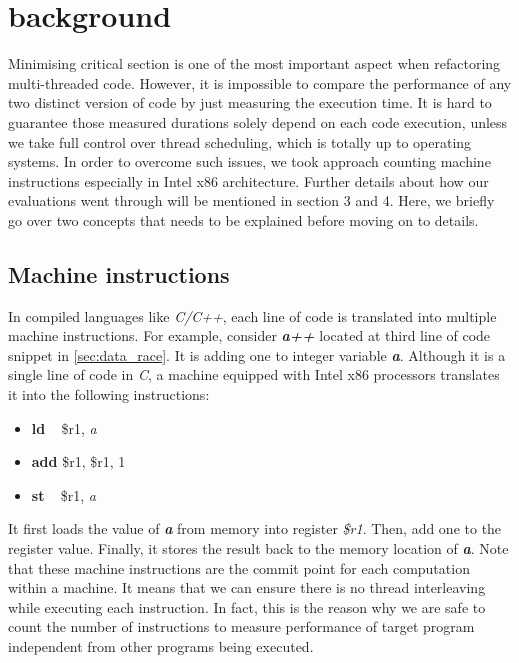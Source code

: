 \section{background}
\label{sec:background}

Minimising critical section is one of the most important aspect when refactoring multi-threaded code. However, it is impossible to compare the performance of any two distinct version of code by just measuring the execution time. It is hard to guarantee those measured durations solely depend on each code execution, unless we take full control over thread scheduling, which is totally up to operating systems. In order to overcome such issues, we took approach counting machine instructions especially in Intel x86 architecture. Further details about how our evaluations went through will be mentioned in section 3 and 4. Here, we briefly go over two concepts that needs to be explained before moving on to details.



\subsection{Machine instructions}
In compiled languages like \textit{C/C++}, each line of code is translated into multiple machine instructions. For example, consider \textbf{\textit{a++}} located at third line of code snippet in \ref{sec:data_race}. It is adding one to integer variable \textbf{\textit{a}}. Although it is a single line of code in \textit{C}, a machine equipped with Intel x86 processors translates it into the following instructions:
\vspace{0.3cm}
\begin{itemize}
	\item[] \textbf{ld} \,\,\, \$r1, \textit{a}
	\item[] \textbf{add} \$r1, \$r1, 1
	\item[] \textbf{st} \,\,\, \$r1, \textit{a}
\end{itemize}

It first loads the value of \textbf{\textit{a}} from memory into register \textit{\$r1}. Then, add one to the register value. Finally, it stores the result back to the memory location of \textbf{\textit{a}}. Note that these machine instructions are the commit point for each computation within a machine. It means that we can ensure there is no thread interleaving while executing each instruction. In fact, this is the reason why we are safe to count the number of instructions to measure performance of target program independent from other programs being executed.